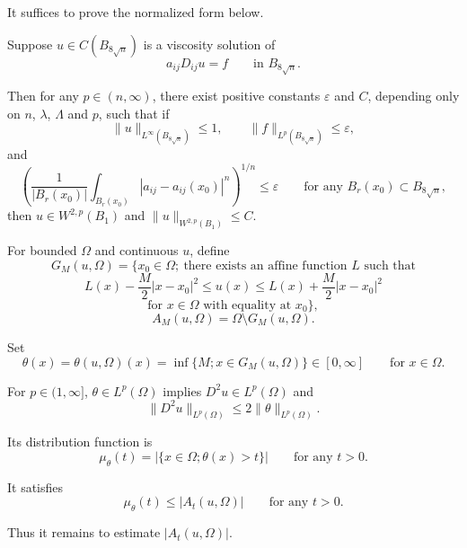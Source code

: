 It suffices to prove the normalized form below.

\begin{lemma}\label{hanlin:ch05-lem-5-23} Suppose $u \in C(B_{8\sqrt{n}})$ is a viscosity solution of
\[
a_{ij}D_{ij}u = f \qquad \text{in } B_{8\sqrt{n}}.
\]

Then for any $p \in (n,\infty)$, there exist positive constants $\varepsilon$ and $C$, depending only on
$n$, $\lambda$, $\Lambda$ and $p$, such that if
\[
\|u\|_{L^\infty(B_{8\sqrt{n}})} \leq 1, \qquad \|f\|_{L^p(B_{8\sqrt{n}})} \leq \varepsilon,
\]
and
\[
\left(\frac{1}{|B_r(x_0)|}\int_{B_r(x_0)} |a_{ij}-a_{ij}(x_0)|^n\right)^{1/n} \leq \varepsilon
\qquad \text{for any } B_r(x_0) \subset B_{8\sqrt{n}},
\]
then $u \in W^{2,p}(B_1)$ and $\|u\|_{W^{2,p}(B_1)} \leq C$.
\end{lemma}

For bounded $\Omega$ and continuous $u$, define
\[
G_M(u,\Omega) = \{x_0 \in \Omega;\ \text{there exists an affine function } L \text{ such that}
\]
\[
L(x) - \frac{M}{2}|x-x_0|^2 \leq u(x) \leq L(x) + \frac{M}{2}|x-x_0|^2
\]
\[
\text{for } x \in \Omega \text{ with equality at } x_0\},
\]
\[
A_M(u,\Omega) = \Omega \setminus G_M(u,\Omega).
\]

Set
\[
\theta(x) = \theta(u,\Omega)(x) = \inf\{M; x \in G_M(u,\Omega)\} \in [0,\infty]
\qquad \text{for } x \in \Omega.
\]

For $p\in(1,\infty]$, $\theta\in L^p(\Omega)$ implies
$D^2u \in L^p(\Omega)$ and
\[
\|D^2u\|_{L^p(\Omega)} \leq 2\|\theta\|_{L^p(\Omega)}.
\]

Its distribution function is
\[
\mu_\theta(t) = |\{x \in \Omega; \theta(x) > t\}| \qquad \text{for any } t>0.
\]

It satisfies
\[
\mu_\theta(t) \leq |A_t(u,\Omega)| \qquad \text{for any } t>0.
\]

Thus it remains to estimate $|A_t(u,\Omega)|$.

